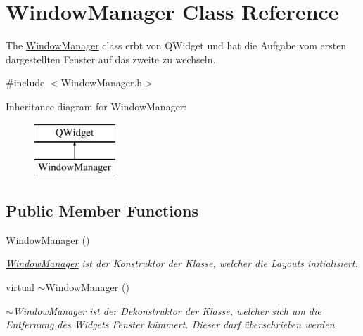 \hypertarget{class_window_manager}{}\section{Window\+Manager Class Reference}
\label{class_window_manager}


The \hyperlink{class_window_manager}{Window\+Manager} class erbt von Q\+Widget und hat die Aufgabe vom ersten dargestellten Fenster auf das zweite zu wechseln.  




{\ttfamily \#include $<$Window\+Manager.\+h$>$}

Inheritance diagram for Window\+Manager\+:\begin{figure}[H]
\begin{center}
\leavevmode
\includegraphics[height=2.000000cm]{class_window_manager}
\end{center}
\end{figure}
\subsection*{Public Member Functions}
\begin{DoxyCompactItemize}
\item 
\hyperlink{class_window_manager_a3a283b34c19aaa20296befaabad4d29b}{Window\+Manager} ()\hypertarget{class_window_manager_a3a283b34c19aaa20296befaabad4d29b}{}\label{class_window_manager_a3a283b34c19aaa20296befaabad4d29b}

\begin{DoxyCompactList}\small\item\em \hyperlink{class_window_manager}{Window\+Manager} ist der Konstruktor der Klasse, welcher die Layouts initialisiert. \end{DoxyCompactList}\item 
virtual \hyperlink{class_window_manager_a19fd6e41c42760af82460d9851780d82}{$\sim$\+Window\+Manager} ()\hypertarget{class_window_manager_a19fd6e41c42760af82460d9851780d82}{}\label{class_window_manager_a19fd6e41c42760af82460d9851780d82}

\begin{DoxyCompactList}\small\item\em $\sim$\+Window\+Manager ist der Dekonstruktor der Klasse, welcher sich um die Entfernung des Widgets Fenster kümmert. Dieser darf überschrieben werden \end{DoxyCompactList}\end{DoxyCompactItemize}



